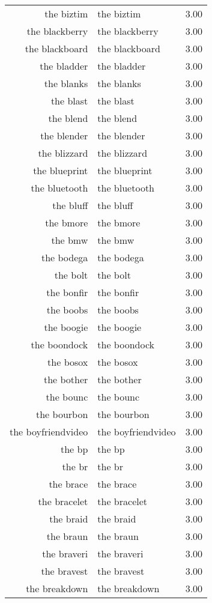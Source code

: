 \begin{table}[ht]
\begin{tabular}{rlr}
  the biztim & the biztim & 3.00 \\ 
  the blackberry & the blackberry & 3.00 \\ 
  the blackboard & the blackboard & 3.00 \\ 
  the bladder & the bladder & 3.00 \\ 
  the blanks & the blanks & 3.00 \\ 
  the blast & the blast & 3.00 \\ 
  the blend & the blend & 3.00 \\ 
  the blender & the blender & 3.00 \\ 
  the blizzard & the blizzard & 3.00 \\ 
  the blueprint & the blueprint & 3.00 \\ 
  the bluetooth & the bluetooth & 3.00 \\ 
  the bluff & the bluff & 3.00 \\ 
  the bmore & the bmore & 3.00 \\ 
  the bmw & the bmw & 3.00 \\ 
  the bodega & the bodega & 3.00 \\ 
  the bolt & the bolt & 3.00 \\ 
  the bonfir & the bonfir & 3.00 \\ 
  the boobs & the boobs & 3.00 \\ 
  the boogie & the boogie & 3.00 \\ 
  the boondock & the boondock & 3.00 \\ 
  the bosox & the bosox & 3.00 \\ 
  the bother & the bother & 3.00 \\ 
  the bounc & the bounc & 3.00 \\ 
  the bourbon & the bourbon & 3.00 \\ 
  the boyfriendvideo & the boyfriendvideo & 3.00 \\ 
  the bp & the bp & 3.00 \\ 
  the br & the br & 3.00 \\ 
  the brace & the brace & 3.00 \\ 
  the bracelet & the bracelet & 3.00 \\ 
  the braid & the braid & 3.00 \\ 
  the braun & the braun & 3.00 \\ 
  the braveri & the braveri & 3.00 \\ 
  the bravest & the bravest & 3.00 \\ 
  the breakdown & the breakdown & 3.00 \\ 

\end{tabular}
\end{table}
